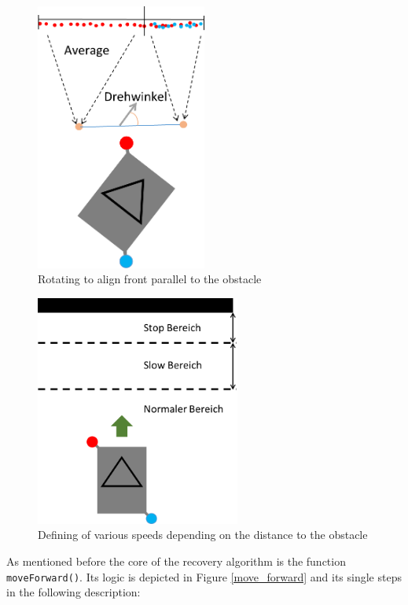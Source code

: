 \begin{figure}[ht]
\centering
\includegraphics[width=0.5\textwidth]{graphics/front_parallel.png}
\caption{Rotating to align front parallel to the obstacle}
\label{parallel}
\centering
\end{figure}

\begin{figure}[ht]
\centering
\includegraphics[width=0.6\textwidth]{graphics/Zone.png}
\caption{Defining of various speeds depending on the distance to the obstacle}
\label{Zone}
\centering
\end{figure}

As mentioned before the core of the recovery algorithm is the function \texttt{moveForward()}. Its logic is depicted in Figure \ref{move_forward} and its single steps in the following description:

